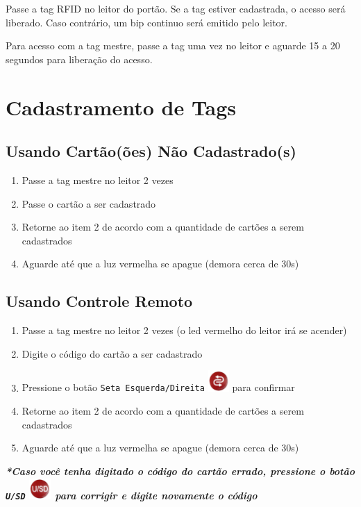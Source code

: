 \documentclass[a4paper, 12pt]{article}
\begin{document}
Passe a tag RFID no leitor do portão. Se a tag estiver cadastrada, o acesso será liberado. Caso contrário, um bip continuo será emitido pelo leitor.\\\par
Para acesso com a tag mestre, passe a tag uma vez no leitor e aguarde 15 a 20 segundos para liberação do acesso.

\section{Cadastramento de Tags}

\subsection{Usando Cartão(ões) Não Cadastrado(s)}

\begin{enumerate}
\item Passe a tag mestre no leitor 2 vezes
\item Passe o cartão a ser cadastrado
\item Retorne ao item 2 de acordo com a quantidade de cartões a serem cadastrados
\item Aguarde até que a luz vermelha se apague (demora cerca de 30s)
\end{enumerate}

\subsection{Usando Controle Remoto}

\begin{enumerate}
\item Passe a tag mestre no leitor 2 vezes (o led vermelho do leitor irá se acender)
\item Digite o código do cartão a ser cadastrado
\item Pressione o botão \texttt{Seta Esquerda/Direita} \includegraphics[height=8mm]{ok} para confirmar
\item Retorne ao item 2 de acordo com a quantidade de cartões a serem cadastrados
\item Aguarde até que a luz vermelha se apague (demora cerca de 30s)
\end{enumerate}

\textbf{\textit{*Caso você tenha digitado o código do cartão errado, pressione o botão \texttt{U/SD} \includegraphics[height=8mm]{cancel} para corrigir e digite novamente o código}}
\end{document}
